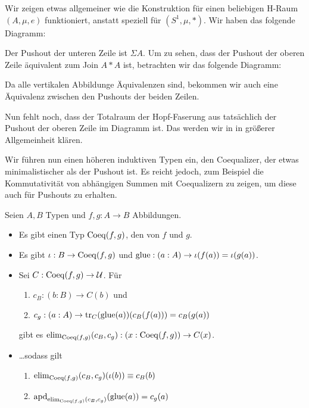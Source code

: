 \begin{beweis}
  Wir zeigen etwas allgemeiner wie die Konstruktion für einen beliebigen H-Raum \((A,\mu,e)\) funktioniert, anstatt speziell für \((S^1,\mu,\ast)\).
  Wir haben das folgende Diagramm:
  \begin{center}
\end{center}
Der Pushout der unteren Zeile ist \(\Sigma A\).
Um zu sehen, dass der Pushout der oberen Zeile äquivalent zum Join \(A\ast A\) ist,
betrachten wir das folgende Diagramm:
\begin{center}
\end{center}
Da alle vertikalen Abbildunge Äquivalenzen sind, bekommen wir auch eine Äquivalenz zwischen den Pushouts der beiden Zeilen.

Nun fehlt noch, dass der Totalraum der Hopf-Faserung aus 
tatsächlich der Pushout der oberen Zeile im Diagramm ist.
Das werden wir in  in größerer Allgemeinheit klären.
\end{beweis}

Wir führen nun einen höheren induktiven Typen ein, den Coequalizer, der etwas minimalistischer als der Pushout ist. Es reicht jedoch, zum Beispiel die Kommutativität von abhängigen Summen mit Coequalizern zu zeigen, um diese auch für Pushouts zu erhalten.

\begin{regeln}
  Seien \(A,B\) Typen und \(f,g:A\to B\) Abbildungen.
  \begin{itemize}
  \item Es gibt einen Typ \(\mathrm{Coeq}(f,g)\), den  von \(f\) und \(g\).
  \item Es gibt \(\iota:B\to \mathrm{Coeq}(f,g)\) und \(\mathrm{glue}:(a:A)\to \iota(f(a))=\iota(g(a))\).
  \item Sei \(C:\mathrm{Coeq}(f,g)\to \mathcal{U}\). Für
    \begin{enumerate}[\ ]
    \item \(c_B:(b:B)\to C(b)\) und
    \item \(c_g:(a:A)\to \mathrm{tr}_C(\mathrm{glue}(a))(c_B(f(a)))=c_B(g(a))\)
    \end{enumerate}
    gibt es \(\mathrm{elim}_{\mathrm{Coeq}(f,g)}(c_B,c_g):(x:\mathrm{Coeq}(f,g))\to C(x)\).
  \item \dots sodass gilt
    \begin{enumerate}[\ ]
    \item \(\mathrm{elim}_{\mathrm{Coeq}(f,g)}(c_B,c_g)(\iota(b))\equiv c_B(b)\)
    \item \(\mathrm{apd}_{\mathrm{elim}_{\mathrm{Coeq}(f,g)}(c_B,c_g)}(\mathrm{glue}(a))=c_g(a)\)
    \end{enumerate}
  \end{itemize}
\end{regeln}

